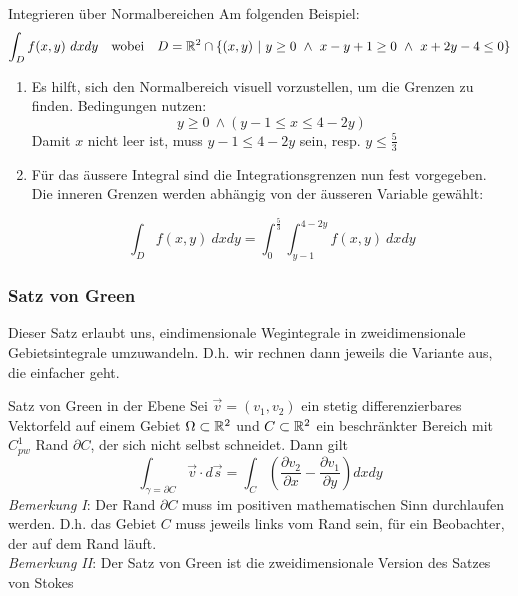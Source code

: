 \begin{Rezept}{Integrieren über Normalbereichen}{}
Am folgenden Beispiel:
\[ \int_D f(x, y) ~ dx dy ~~ \text{ wobei } ~~ D = \mathbb{R}^2 \cap \{(x, y) ~ | ~ y \geq 0 ~ \wedge ~ x-y+1\geq 0 ~ \wedge ~ x+2y-4 \leq 0\}\]
\begin{enumerate}
\item {
Es hilft, sich den Normalbereich visuell vorzustellen, um die Grenzen
zu finden. Bedingungen nutzen:
\[ y \geq 0 ~ \wedge (y-1 \leq x \leq 4-2y) \]
Damit $x$ nicht leer ist, muss $y-1 \leq 4-2y$ sein, resp. $y \leq \frac{5}{3}$ 
}
\item {
Für das äussere Integral sind die Integrationsgrenzen nun fest vorgegeben. Die inneren Grenzen
werden abhängig von der äusseren Variable gewählt:

\[ \int_D f(x,y) ~ dx dy = \int_0^{\frac{5}{3}} \int_{y-1}^{4-2y} f(x,y) ~ dx dy \]

}
\end{enumerate}
\end{Rezept}

\subsubsection{Satz von Green}

Dieser Satz erlaubt uns, eindimensionale Wegintegrale in zweidimensionale Gebietsintegrale umzuwandeln. D.h. wir rechnen dann jeweils die Variante aus, die einfacher geht.

\begin{Satz}{Satz von Green in der Ebene}{}
	Sei $\vec{v} = (v_1, v_2)$ ein stetig differenzierbares Vektorfeld auf einem Gebiet $\Omega \subset \mathbb{R}^2$ und $C \subset \mathbb{R}^2$ ein beschränkter Bereich mit $C^1_{pw}$ Rand $\partial C$, der sich nicht selbst schneidet. Dann gilt
	\[
		\int_{\gamma=\partial C} \vec{v} \cdot d\vec{s} = 
		\int_C \left(\frac{\partial v_2}{\partial x} - \frac{\partial v_1}{\partial y}\right) dxdy
	\]
	\textit{Bemerkung I}: Der Rand $\partial C$ muss im positiven mathematischen Sinn durchlaufen werden. D.h. das Gebiet $C$ muss jeweils links vom Rand sein, für ein Beobachter, der auf dem Rand läuft.\\
	
	\textit{Bemerkung II}: Der Satz von Green ist die zweidimensionale Version des Satzes von Stokes
\end{Satz}

